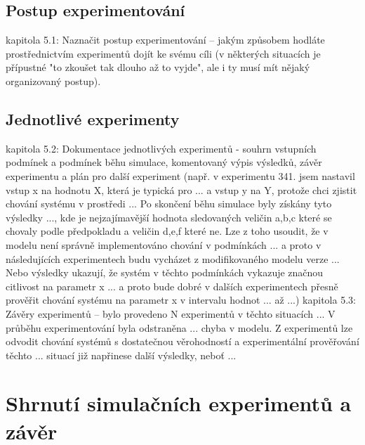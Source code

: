 \documentclass[a4paper,11pt]{article}
\begin{document}
\subsection{Postup experimentování}

kapitola 5.1: Naznačit postup experimentování – jakým způsobem hodláte prostřednictvím experimentů dojít ke svému cíli (v některých situacích je přípustné "to zkoušet tak dlouho až to vyjde", ale i ty musí mít nějaký organizovaný postup).
\subsection{Jednotlivé experimenty}
kapitola 5.2: Dokumentace jednotlivých experimentů - souhrn vstupních podmínek a podmínek běhu simulace, komentovaný výpis výsledků, závěr experimentu a plán pro další experiment (např. v experimentu 341. jsem nastavil vstup x na hodnotu X, která je typická pro ... a vstup y na Y, protože chci zjistit chování systému v prostředi ... Po skončení běhu simulace byly získány tyto výsledky ..., kde je nejzajímavější hodnota sledovaných veličin a,b,c které se chovaly podle předpokladu a veličin d,e,f které ne. Lze z toho usoudit, že v modelu není správně implementováno chování v podmínkách ... a proto v následujících experimentech budu vycházet z modifikovaného modelu verze ... Nebo výsledky ukazují, že systém v těchto podmínkách vykazuje značnou citlivost na parametr x ... a proto bude dobré v dalších experimentech přesně prověřit chování systému na parametr x v intervalu hodnot ... až ...)
kapitola 5.3: Závěry experimentů – bylo provedeno N experimentů v těchto situacích ... V průběhu experimentování byla odstraněna ... chyba v modelu. Z experimentů lze odvodit chování systémů s dostatečnou věrohodností a experimentální prověřování těchto ... situací již napřinese další výsledky, neboť ...


\section{Shrnutí simulačních experimentů a závěr}
\end{document}
